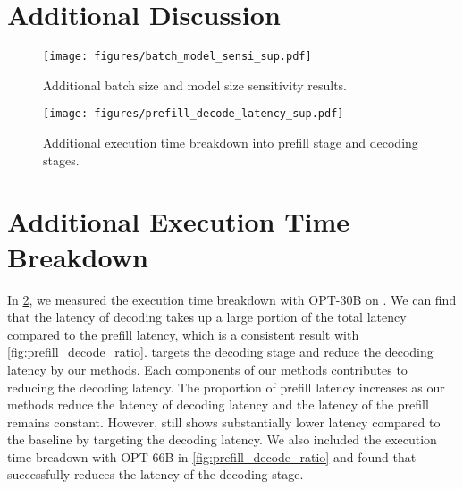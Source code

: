\section{Additional Discussion}








\begin{figure}[h]
    \centering
    \texttt{[image: figures/batch\_model\_sensi\_sup.pdf]}       
    \caption{
    Additional batch size and model size sensitivity results.}
    \label{fig:sup_batch_model_sensi}
\end{figure}

\begin{figure}[]
    \centering
    \texttt{[image: figures/prefill\_decode\_latency\_sup.pdf]}       
    \caption{
    Additional execution time breakdown into prefill stage and decoding stages.}
    \label{fig:prefill_decode_ratio_sup}
\end{figure}



\section{Additional Execution Time Breakdown}

In \cref{fig:prefill_decode_ratio_sup}, we measured the execution time breakdown with OPT-30B on \thiswork.
We can find that the latency of decoding takes up a large portion of the total latency compared to the prefill latency, which is a consistent result with \cref{fig:prefill_decode_ratio}.
\thiswork targets the decoding stage and reduce the decoding latency by our methods.
Each components of our methods contributes to reducing the decoding latency.
The proportion of prefill latency increases as our methods reduce the latency of decoding latency and the latency of the prefill remains constant.
However, \thiswork still shows substantially lower latency compared to the baseline by targeting the decoding latency.
We also included the execution time breadown with OPT-66B in \cref{fig:prefill_decode_ratio} and found that \thiswork successfully reduces the latency of the decoding stage.